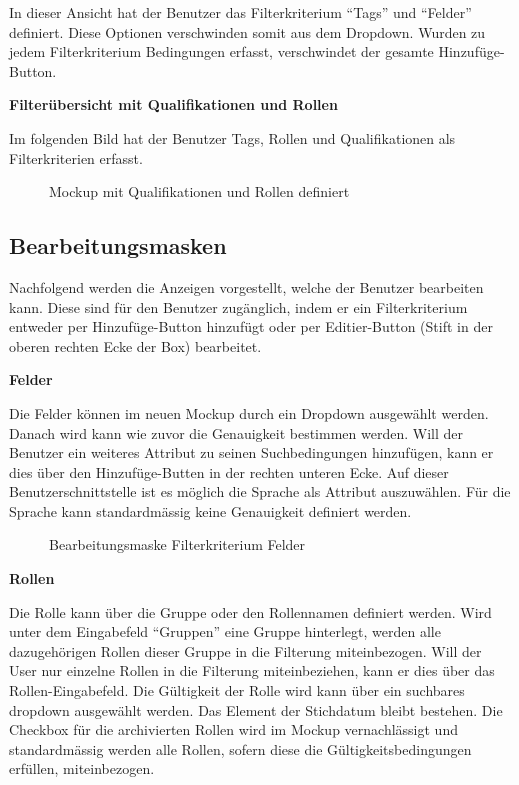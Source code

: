 In dieser Ansicht hat der Benutzer das Filterkriterium ``Tags'' und ``Felder'' definiert. Diese Optionen verschwinden
somit aus dem Dropdown. Wurden zu jedem Filterkriterium Bedingungen erfasst, verschwindet der gesamte Hinzufüge-Button.

\newpage

\textbf{Filterübersicht mit Qualifikationen und Rollen}

Im folgenden Bild hat der Benutzer Tags, Rollen und Qualifikationen als Filterkriterien erfasst.

\begin{figure}[h]
   \centering
   \caption{Mockup mit Qualifikationen und Rollen definiert}
\end{figure}

\subsection{Bearbeitungsmasken}
Nachfolgend werden die Anzeigen vorgestellt, welche der Benutzer bearbeiten kann. Diese sind für den Benutzer zugänglich, indem er
ein Filterkriterium entweder per Hinzufüge-Button hinzufügt oder per Editier-Button (Stift in der oberen rechten Ecke der Box) bearbeitet.

\textbf{Felder}

Die Felder können im neuen Mockup durch ein Dropdown ausgewählt werden. Danach wird kann wie zuvor die Genauigkeit bestimmen werden.
Will der Benutzer ein weiteres Attribut zu seinen Suchbedingungen hinzufügen, kann er dies über den Hinzufüge-Butten in der rechten unteren Ecke. Auf dieser
Benutzerschnittstelle ist es möglich die Sprache als Attribut auszuwählen. Für die Sprache kann standardmässig keine Genauigkeit definiert werden.

\begin{figure}[h]
   \centering
   \caption{Bearbeitungsmaske Filterkriterium Felder}
\end{figure}

\newpage

\textbf{Rollen}

Die Rolle kann über die Gruppe oder den Rollennamen definiert werden. Wird unter dem Eingabefeld ``Gruppen'' eine Gruppe hinterlegt,
werden alle dazugehörigen Rollen dieser Gruppe in die Filterung miteinbezogen. Will der User nur einzelne Rollen
in die Filterung miteinbeziehen, kann er dies über das Rollen-Eingabefeld. Die Gültigkeit der Rolle wird kann über ein suchbares dropdown ausgewählt werden.
Das Element der Stichdatum bleibt bestehen. Die Checkbox für die archivierten Rollen wird im Mockup vernachlässigt und standardmässig werden alle Rollen,
sofern diese die Gültigkeitsbedingungen erfüllen, miteinbezogen.

